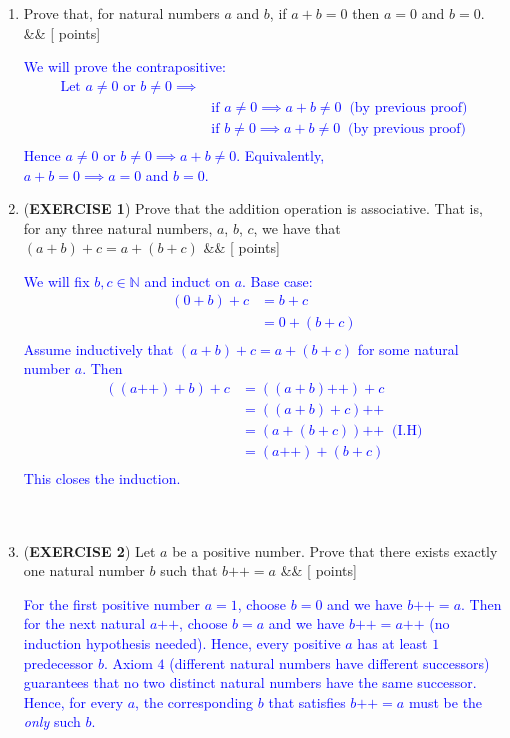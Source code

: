 \documentclass[12pt]{article}
\newcommand{\points}[1]{\hfill {[#1 points]}}
\newcommand{\problem}[2][]{%
  \item {#2}%
  \ifx&#1&%
  \else%
    \points{#1}%
  \fi
  \par\vspace{0.5em}
}
\begin{document}
\begin{enumerate}[leftmargin=*, label=\textbf{\arabic*.}]
	\problem{Prove that, for natural numbers $a$ and $b$, if $a + b = 0$ then $a = 0$ and $b = 0$.}
	\textcolor{blue}{We will prove the contrapositive:
	\begin{align*}
	\text{Let $a \neq 0$ or $b \neq 0$} \implies& \\
	& \text{if $a \neq 0$} \implies a+b \neq 0 \;\; \text{(by previous proof)} \\
	& \text{if $b \neq 0$} \implies a+b \neq 0 \;\; \text{(by previous proof)} \\
	\end{align*}
	Hence $a \neq 0$ or $b \neq 0 \implies a+b \neq 0$. Equivalently, \\ $a+b = 0 \implies a = 0$ and $b = 0$.}
	
    \problem{(\textbf{EXERCISE 1}) Prove that the addition operation is associative. That is, for any three natural numbers, $a$, $b$, $c$, we have that $(a+b)+c = a+(b+c)$}
    	\textcolor{blue}{We will fix $b,c \in \mathbb{N}$ and induct on $a$. Base case:
	\begin{align*}
	(0 + b) + c &=b + c \\
	&= 0 + (b + c)\\
	\end{align*}
	Assume inductively that $(a + b) + c = a + (b + c)$ for some natural number $a$. Then
	\begin{align*}
	((a\text{++}) + b) + c &= ((a + b)\text{++}) + c\\
	&= ((a+b) + c)\text{++}  \\
	& = (a + (b + c))\text{++} \;\; \text{(I.H)} \\
	&= (a\text{++}) + (b+c) \\
	\end{align*}
	This closes the induction.}
	\\ \\ \\
	\problem{(\textbf{EXERCISE 2}) Let $a$ be a positive number. Prove that there exists exactly one natural number $b$ such that $b\text{++} = a$}
	\textcolor{blue}{ 
	For the first positive number $a = 1$, choose $b = 0$ and we have $b\text{++} = a$. Then for the next natural $a\text{++}$, choose $b = a$ and we have $b\text{++} = a\text{++}$ (no induction hypothesis needed). Hence, every positive $a$ has at least $1$ predecessor $b$. Axiom $4$ (different natural numbers have different successors) guarantees that no two distinct natural numbers have the same successor. Hence, for every $a$, the corresponding $b$ that satisfies $b\text{++} = a$ must be the \textit{only} such $b$. \\ \\}
	

\end{enumerate}
\end{document}
